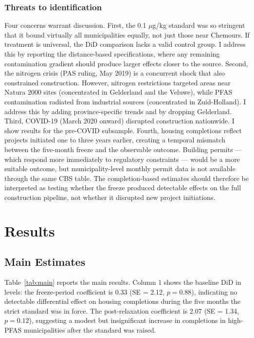 \documentclass[12pt]{article}
\begin{document}
\subsubsection*{Threats to identification} Four concerns warrant discussion. First, the 0.1 $\mu$g/kg standard was so stringent that it bound virtually all municipalities equally, not just those near Chemours. If treatment is universal, the DiD comparison lacks a valid control group. I address this by reporting the distance-based specifications, where any remaining contamination gradient should produce larger effects closer to the source. Second, the nitrogen crisis (PAS ruling, May 2019) is a concurrent shock that also constrained construction. However, nitrogen restrictions targeted areas near Natura 2000 sites (concentrated in Gelderland and the Veluwe), while PFAS contamination radiated from industrial sources (concentrated in Zuid-Holland). I address this by adding province-specific trends and by dropping Gelderland. Third, COVID-19 (March 2020 onward) disrupted construction nationwide. I show results for the pre-COVID subsample. Fourth, housing completions reflect projects initiated one to three years earlier, creating a temporal mismatch between the five-month freeze and the observable outcome. Building permits --- which respond more immediately to regulatory constraints --- would be a more suitable outcome, but municipality-level monthly permit data is not available through the same CBS table. The completion-based estimates should therefore be interpreted as testing whether the freeze produced detectable effects on the full construction pipeline, not whether it disrupted new project initiations.

\section{Results}

\subsection{Main Estimates}

Table~\ref{tab:main} reports the main results. Column 1 shows the baseline DiD in levels: the freeze-period coefficient is 0.33 (SE = 2.12, $p = 0.88$), indicating no detectable differential effect on housing completions during the five months the strict standard was in force. The post-relaxation coefficient is 2.07 (SE = 1.34, $p = 0.12$), suggesting a modest but insignificant increase in completions in high-PFAS municipalities after the standard was raised.
\end{document}
